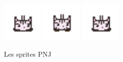 \documentclass{article}
\begin{document}
\begin{figure}[h]
    \includegraphics[height = 2cm]{zebi/idle_1.png}
    \includegraphics[height = 2cm]{zebi/idle_2.png}
    \includegraphics[height = 2cm]{zebi/idle_3.png}
    \caption{Les sprites PNJ}\label{risette}


\end{figure}
\end{document}
